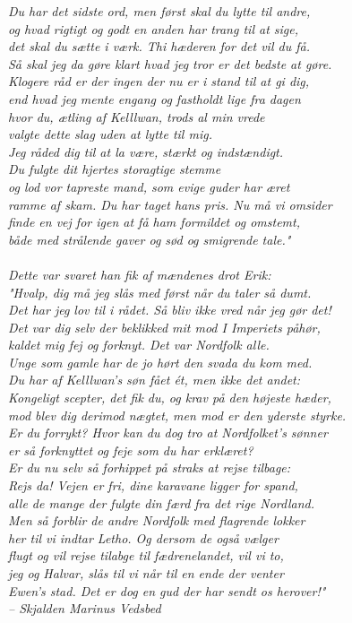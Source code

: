 \documentclass[letterpaper,12pt]{memoir}
\newenvironment{pullquote}
  {\begin{tcolorbox}[enhanced, breakable]\itshape\large}
  {\end{tcolorbox}}
\begin{document}
\begin{pullquote}
Du har det sidste ord, men først skal du lytte til andre,\\
og hvad rigtigt og godt en anden har trang til at sige,\\
det skal du sætte i værk. Thi hæderen for det vil du få.\\
Så skal jeg da gøre klart hvad jeg tror er det bedste at gøre.\\
Klogere råd er der ingen der nu er i stand til at gi dig,\\
end hvad jeg mente engang og fastholdt lige fra dagen\\
hvor du, ætling af Kelllwan, trods al min vrede\\
valgte dette slag uden at lytte til mig.\\
Jeg råded dig til at la være, stærkt og indstændigt.\\
Du fulgte dit hjertes storagtige stemme\\
og lod vor tapreste mand, som evige guder har æret\\
ramme af skam. Du har taget hans pris. Nu må vi omsider\\
finde en vej for igen at få ham formildet og omstemt,\\
både med strålende gaver og sød og smigrende tale."\\\\
Dette var svaret han fik af mændenes drot Erik:\\
"Hvalp, dig må jeg slås med først når du taler så dumt.\\
Det har jeg lov til i rådet. Så bliv ikke vred når jeg gør det!\\
Det var dig selv der beklikked mit mod I Imperiets påhør, \\
kaldet mig fej og forknyt. Det var Nordfolk alle.\\
Unge som gamle har de jo hørt den svada du kom med.\\
Du har af Kelllwan's søn fået ét, men ikke det andet:\\
Kongeligt scepter, det fik du, og krav på den højeste hæder,\\
mod blev dig derimod nægtet, men mod er den yderste styrke.\\
Er du forrykt? Hvor kan du dog tro at Nordfolket's sønner\\
er så forknyttet og feje som du har erklæret?\\
Er du nu selv så forhippet på straks at rejse tilbage: \\
Rejs da! Vejen er fri, dine karavane ligger for spand,\\
alle de mange der fulgte din færd fra det rige Nordland.\\
Men så forblir de andre Nordfolk med flagrende lokker\\
her til vi indtar Letho. Og dersom de også vælger\\
flugt og vil rejse tilabge til fædrenelandet, vil vi to,\\
jeg og Halvar, slås til vi når til en ende der venter\\
Ewen's stad. Det er dog en gud der har sendt os herover!"\\
\textit{– Skjalden Marinus Vedsbed}
\end{pullquote}
\end{document}
